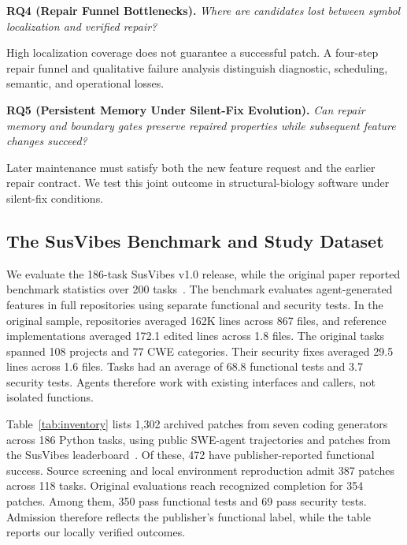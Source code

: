 \documentclass[10pt,conference]{IEEEtran}
\begin{document}
\smallskip
\noindent\textbf{RQ4 (Repair Funnel Bottlenecks).} \emph{Where are candidates lost between symbol localization and verified repair?}\par
High localization coverage does not guarantee a successful patch. A four-step repair funnel and qualitative failure analysis distinguish diagnostic, scheduling, semantic, and operational losses.

\smallskip
\noindent\textbf{RQ5 (Persistent Memory Under Silent-Fix Evolution).} \emph{Can repair memory and boundary gates preserve repaired properties while subsequent feature changes succeed?}\par
Later maintenance must satisfy both the new feature request and the earlier repair contract. We test this joint outcome in structural-biology software under silent-fix conditions.

\subsection{The SusVibes Benchmark and Study Dataset}
We evaluate the 186-task SusVibes v1.0 release, while the original paper reported benchmark statistics over 200 tasks~\cite{susvibes,susvibesartifact}. The benchmark evaluates agent-generated features in full repositories using separate functional and security tests. In the original sample, repositories averaged 162K lines across 867 files, and reference implementations averaged 172.1 edited lines across 1.8 files. The original tasks spanned 108 projects and 77 CWE categories. Their security fixes averaged 29.5 lines across 1.6 files. Tasks had an average of 68.8 functional tests and 3.7 security tests. Agents therefore work with existing interfaces and callers, not isolated functions.

Table~\ref{tab:inventory} lists 1,302 archived patches from seven coding generators across 186 Python tasks, using public SWE-agent trajectories and patches from the SusVibes leaderboard~\cite{susvibestrajectories}. Of these, 472 have publisher-reported functional success. Source screening and local environment reproduction admit 387 patches across 118 tasks. Original evaluations reach recognized completion for 354 patches. Among them, 350 pass functional tests and 69 pass security tests. Admission therefore reflects the publisher's functional label, while the table reports our locally verified outcomes.

\begin{table}[t]
\caption{Cohort inventory, locally verified original outcomes, and reference-symbol review coverage. Verif. counts completed original evaluations. Func and Sec refer to that subset. Coverage uses all 387 admitted patches.}
\label{tab:inventory}
\centering\footnotesize

\end{table}
\end{document}
